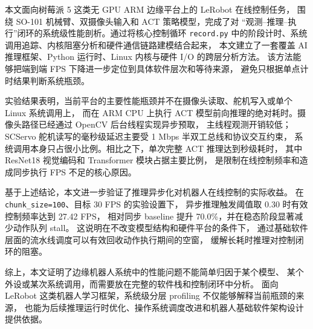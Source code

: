 本文面向树莓派 5 这类无 GPU ARM 边缘平台上的 LeRobot 在线控制任务，
围绕 SO-101 机械臂、双摄像头输入和 ACT 策略模型，完成了对
``观测--推理--执行''闭环的系统级性能剖析。通过将核心控制循环
\texttt{record.py} 中的阶段计时、系统调用追踪、内核阻塞分析和硬件通信链路建模结合起来，
本文建立了一套覆盖 AI 推理框架、Python 运行时、Linux 内核与硬件 I/O 的跨层分析方法。
该方法能够把端到端 FPS 下降进一步定位到具体软件层次和等待来源，
避免只根据单点计时结果判断系统瓶颈。

实验结果表明，当前平台的主要性能瓶颈并不在摄像头读取、舵机写入或单个 Linux 系统调用上，
而在 ARM CPU 上执行 ACT 模型前向推理的绝对耗时。摄像头路径已经通过 OpenCV 后台线程实现异步预取，
主线程观测开销较低；SCServo 舵机读写的毫秒级延迟主要受 1 Mbps 半双工总线和协议交互约束，
系统调用本身只占很小比例。相比之下，单次完整 ACT 推理达到秒级耗时，
其中 ResNet18 视觉编码和 Transformer 模块占据主要比例，
是限制在线控制频率和造成同步执行 FPS 不足的核心原因。

基于上述结论，本文进一步验证了推理异步化对机器人在线控制的实际收益。
在 \texttt{chunk\_size=100}、目标 30 FPS 的实验设置下，
异步推理触发阈值取 0.30 时有效控制频率达到 27.42 FPS，
相对同步 baseline 提升 70.0\%，并在稳态阶段显著减少动作队列 stall。
这说明在不改变模型结构和硬件平台的条件下，
通过基础软件层面的流水线调度可以有效回收动作执行期间的空窗，
缓解长耗时推理对控制闭环的阻塞。

综上，本文证明了边缘机器人系统中的性能问题不能简单归因于某个模型、
某个外设或某次系统调用，而需要放在完整的软件栈和控制闭环中分析。
面向 LeRobot 这类机器人学习框架，系统级分层 profiling 不仅能够解释当前瓶颈的来源，
也能为后续推理运行时优化、操作系统调度改进和机器人基础软件架构设计提供依据。
